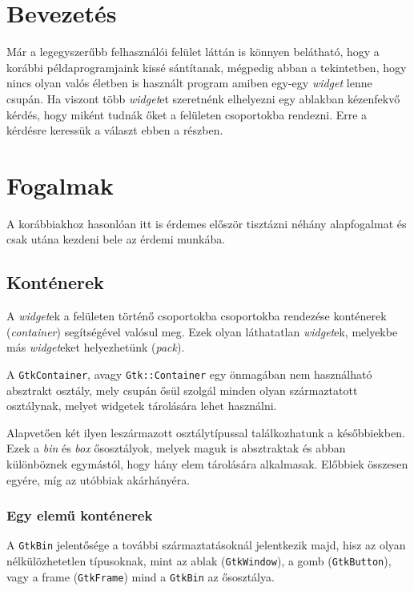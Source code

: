 \section{Bevezetés}

Már a legegyszerűbb felhasználói felület láttán is könnyen belátható, hogy a korábbi példaprogramjaink kissé sántítanak, mégpedig abban a tekintetben, hogy nincs olyan valós életben is használt program amiben egy-egy \textit{widget} lenne csupán. Ha viszont több \textit{widget}et szeretnénk elhelyezni egy ablakban kézenfekvő kérdés, hogy miként tudnák őket a felületen csoportokba rendezni. Erre a kérdésre keressük a választ ebben a részben.

\section{Fogalmak}

A korábbiakhoz hasonlóan itt is érdemes először tisztázni néhány alapfogalmat és csak utána kezdeni bele az érdemi munkába.

\subsection{Konténerek}

A \textit{widget}ek a felületen történő csoportokba csoportokba rendezése konténerek (\textit{container}) segítségével valósul meg. Ezek olyan láthatatlan \textit{widget}ek, melyekbe más \textit{widget}eket helyezhetünk (\textit{pack}).

A \texttt{GtkContainer}, avagy \texttt{Gtk::Container} egy önmagában nem használható absztrakt osztály, mely csupán ősül szolgál minden olyan származtatott osztálynak, melyet widgetek tárolására lehet használni.

Alapvetően két ilyen leszármazott osztálytípussal találkozhatunk a későbbiekben. Ezek a \textit{bin} és \textit{box} ősosztályok, melyek maguk is absztraktak és abban különböznek egymástól, hogy hány elem tárolására alkalmasak. Előbbiek összesen egyére, míg az utóbbiak akárhányéra.

\subsubsection{Egy elemű konténerek}

\label{sec:bin}
A \texttt{GtkBin} jelentősége a további származtatásoknál jelentkezik majd, hisz az olyan nélkülözhetetlen típusoknak, mint az ablak (\texttt{GtkWindow}), a gomb (\texttt{GtkButton}), vagy a frame (\texttt{GtkFrame}) mind a \texttt{GtkBin} az ősosztálya.

